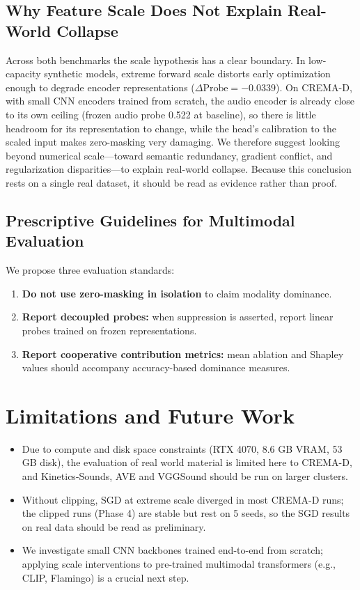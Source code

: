 \documentclass[conference]{IEEEtran}
\begin{document}
\subsection{Why Feature Scale Does Not Explain Real-World Collapse}
Across both benchmarks the scale hypothesis has a clear boundary. In low-capacity synthetic models, extreme forward scale distorts early optimization enough to degrade encoder representations ($\Delta \text{Probe} = -0.0339$). %
On CREMA-D, with small CNN encoders trained from scratch, the audio encoder is already close to its own ceiling (frozen audio probe 0.522 at baseline), so there is little headroom for its representation to change, while the head's calibration to the scaled input makes zero-masking very damaging. We therefore suggest looking beyond numerical scale---toward semantic redundancy, gradient conflict, and regularization disparities---to explain real-world collapse. Because this conclusion rests on a single real dataset, it should be read as evidence rather than proof.

\subsection{Prescriptive Guidelines for Multimodal Evaluation}
We propose three evaluation standards:
\begin{enumerate}
    \item \textbf{Do not use zero-masking in isolation} to claim modality dominance.
    \item \textbf{Report decoupled probes:} when suppression is asserted, report linear probes trained on frozen representations.
    \item \textbf{Report cooperative contribution metrics:} mean ablation and Shapley values should accompany accuracy-based dominance measures.
\end{enumerate}

\section{Limitations and Future Work}
\begin{itemize}
    \item Due to compute and disk space constraints (RTX 4070, 8.6 GB VRAM, 53 GB disk), the evaluation of real world material is limited here to CREMA-D, and Kinetics-Sounds, AVE and VGGSound should be run on larger clusters.
    \item Without clipping, SGD at extreme scale diverged in most CREMA-D runs; the clipped runs (Phase 4) are stable but rest on 5 seeds, so the SGD results on real data should be read as preliminary.
    \item We investigate small CNN backbones trained end-to-end from scratch; applying scale interventions to pre-trained multimodal transformers (e.g., CLIP, Flamingo) is a crucial next step.
\end{itemize}
\end{document}
